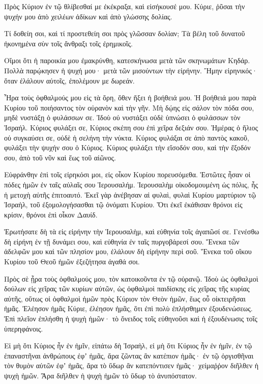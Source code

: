 \begin{spacing}{1.1}
\begin{multicols}{2}
Πρὸς Κύριον ἐν τῷ θλίβεσθαί με ἐκέκραξα, καὶ εἰσήκουσέ μου.
Κύριε, ῥῦσαι τὴν ψυχήν μου ἀπὸ χειλέων ἀδίκων καὶ ἀπὸ γλώσσης δολίας.

Τί δοθείη σοι, καὶ τί προστεθείη σοι πρὸς γλῶσσαν δολίαν;
Τὰ βέλη τοῦ δυνατοῦ ἠκονημένα σὺν τοῖς ἄνθραξι τοῖς ἐρημικοῖς.

Οἴμοι ὅτι ἡ παροικία μου ἐμακρύνθη, κατεσκήνωσα μετὰ τῶν σκηνωμάτων Κηδάρ.
Πολλὰ παρῴκησεν ἡ ψυχή μου· μετὰ τῶν μισούντων τὴν εἰρήνην.
Ἤμην εἰρηνικός· ὅταν ἐλάλουν αὐτοῖς, ἐπολέμουν με δωρεάν.

Ἦρα τοὺς ὀφθαλμούς μου εἰς τὰ ὄρη, ὅθεν ἥξει ἡ βοήθειά μου.
Ἡ βοήθειά μου παρὰ Κυρίου τοῦ ποιήσαντος τὸν οὐρανὸν καὶ τὴν γῆν.
Μὴ δῴης εἰς σάλον τὸν πόδα σου, μηδὲ νυστάξῃ ὁ φυλάσσων σε.
Ἰδοὺ οὐ νυστάξει οὐδὲ ὑπνώσει ὁ φυλάσσων τὸν Ἰσραήλ.
Κύριος φυλάξει σε, Κύριος σκέπη σου ἐπὶ χεῖρα δεξιάν σου.
Ἡμέρας ὁ ἥλιος οὐ συγκαύσει σε, οὐδὲ ἡ σελήνη τὴν νύκτα.
Κύριος φυλάξαι σε ἀπὸ παντὸς κακοῦ, φυλάξει τὴν ψυχήν σου ὁ Κύριος.
Κύριος φυλάξει τὴν εἴσοδόν σου, καὶ τὴν ἔξοδόν σου, ἀπὸ τοῦ νῦν καὶ ἕως τοῦ αἰῶνος.

Εὐφράνθην ἐπὶ τοῖς εἰρηκόσι μοι, εἰς οἶκον Κυρίου πορευσόμεθα.
Ἑστῶτες ἦσαν οἱ πόδες ἡμῶν ἐν ταῖς αὐλαῖς σου Ἱερουσαλήμ.
Ἱερουσαλὴμ οἰκοδομουμένη ὡς πόλις, ἧς ἡ μετοχὴ αὐτῆς ἐπιτοαυτό.
Ἐκεῖ γὰρ ἀνέβησαν αἱ φυλαὶ, φυλαὶ Κυρίου μαρτύριον τῷ Ἰσραὴλ, τοῦ ἐξομολογήσασθαι τῷ ὀνόματι Κυρίου.
Ὅτι ἐκεῖ ἐκάθισαν θρόνοι εἰς κρίσιν, θρόνοι ἐπὶ οἶκον Δαυίδ.

Ἐρωτήσατε δὴ τὰ εἰς εἰρήνην τὴν Ἱερουσαλὴμ, καὶ εὐθηνία τοῖς ἀγαπῶσί σε.
Γενέσθω δὴ εἰρήνη ἐν τῇ δυνάμει σου, καὶ εὐθηνία ἐν ταῖς πυργοβάρεσί σου.
Ἕνεκα τῶν ἀδελφῶν μου καὶ τῶν πλησίον μου, ἐλάλουν δὴ εἰρήνην περὶ σοῦ.
Ἕνεκα τοῦ οἴκου Κυρίου τοῦ Θεοῦ ἡμῶν ἐξεζήτησα ἀγαθά σοι.

Πρὸς σὲ ᾖρα τοὺς ὀφθαλμούς μου, τὸν κατοικοῦντα ἐν τῷ οὐρανῷ.
Ἰδοὺ ὡς ὀφθαλμοὶ δούλων εἰς χεῖρας τῶν κυρίων αὐτῶν, ὡς ὀφθαλμοὶ παιδίσκης εἰς χεῖρας τῆς κυρίας αὐτῆς, οὕτως οἱ ὀφθαλμοὶ ἡμῶν πρὸς Κύριον τὸν Θεὸν ἡμῶν, ἕως οὗ οἰκτειρῆσαι ἡμᾶς.
Ἐλέησον ἡμᾶς Κύριε, ἐλέησον ἡμᾶς, ὅτι ἐπὶ πολὺ ἐπλήσθημεν ἐξουδενώσεως.
Ἐπὶ πλεῖον ἐπλήσθη ἡ ψυχὴ ἡμῶν· τὸ ὄνειδος τοῖς εὐθηνοῦσι καὶ ἡ ἐξουδένωσις τοῖς ὑπερηφάνοις.

Εἰ μὴ ὅτι Κύριος ἦν ἐν ἡμῖν, εἰπάτω δὴ Ἰσραὴλ,
εἰ μὴ ὅτι Κύριος ἦν ἐν ἡμῖν, ἐν τῷ ἐπαναστῆναι ἀνθρώπους ἐφʼ ἡμᾶς,
ἄρα ζῶντας ἂν κατέπιον ἡμᾶς· ἐν τῷ ὀργισθῆναι τὸν θυμὸν αὐτῶν ἐφʼ ἡμᾶς,
ἄρα τὸ ὕδωρ ἂν κατεπόντισεν ἡμᾶς· χείμαῤῥον διῆλθεν ἡ ψυχὴ ἡμῶν.
Ἄρα διῆλθεν ἡ ψυχὴ ἡμῶν τὸ ὕδωρ τὸ ἀνυπόστατον.


\end{multicols}
\end{spacing}
